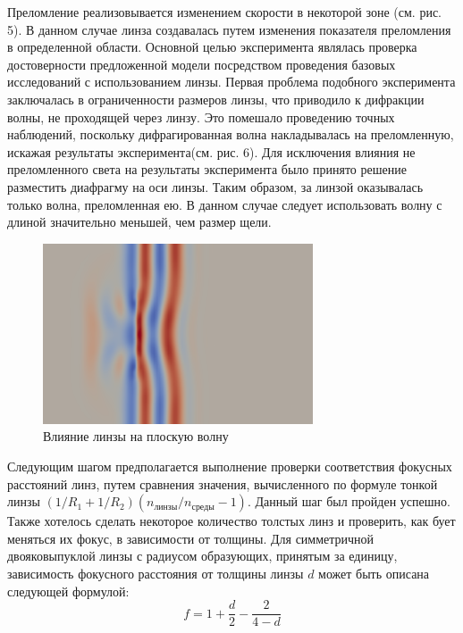 \documentclass[
11pt,%
tightenlines,%
twoside,%
onecolumn,%
nofloats,%
nobibnotes,%
nofootinbib,%
superscriptaddress,%
noshowpacs,%
centertags]%
{revtex4}
\begin{document}
Преломление реализовывается изменением скорости в некоторой зоне
(см. рис. 5). В данном случае линза создавалась путем изменения
показателя преломления в определенной области. Основной целью эксперимента являлась проверка
достоверности предложенной модели посредством проведения базовых исследований с использованием линзы.
Первая проблема подобного эксперимента заключалась в ограниченности размеров линзы,
что приводило к дифракции волны, не проходящей через линзу. \newline
Это помешало проведению точных
наблюдений, поскольку дифрагированная волна накладывалась на преломленную, искажая результаты
эксперимента(см. рис. 6).
Для исключения влияния не преломленного света на результаты эксперимента было принято решение
разместить диафрагму на оси линзы. Таким образом, за линзой оказывалась только волна, преломленная ею.
В данном случае следует использовать волну с длиной значительно меньшей, чем размер щели.\newline
\begin{figure}[h]
    \centering
    \includegraphics[width=8cm]{Lens.png}
    \caption{Влияние линзы на плоскую волну}
    \label{fig:1}
\end{figure}
Следующим шагом предполагается выполнение проверки соответствия фокусных расстояний линз, 
путем сравнения значения, вычисленного по формуле тонкой линзы \((1/R_1+1/R_2)(n_{линзы}/n_{среды}-1)\). 
Данный шаг был пройден успешно. \newline
Также хотелось сделать некоторое количество толстых линз и проверить, как бует меняться их фокус, 
в зависимости от толщины. Для симметричной двояковыпуклой линзы с радиусом образующих, принятым за
единицу, зависимость фокусного расстояния от толщины линзы \( d \) может быть описана следующей 
формулой:
\begin{equation}
    f = 1 + \frac{d}{2} - \frac{2}{4-d}
\end{equation}
\end{document}
